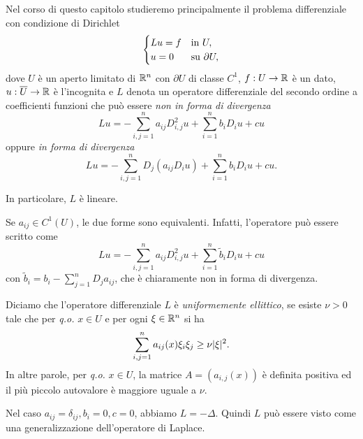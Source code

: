 Nel corso di questo capitolo studieremo principalmente il problema differenziale con condizione di Dirichlet
\begin{equation}
	\begin{cases}
		Lu = f & \textup{in } U,\\
		u = 0 & \textup{su } \partial U,
	\end{cases}
\end{equation}
dove $U$ è un aperto limitato di $\mathbb{R}^n$ con $\partial U$ di classe $C^1$, $f: U \to \mathbb{R}$ è un dato, $u: \overline{U} \to \mathbb{R}$ è l'incognita e $L$ denota un operatore differenziale del secondo ordine a coefficienti funzioni che può essere \emph{non in forma di divergenza}
\[ Lu = -\sum_{i,j=1}^{n}a_{ij}D^2_{i,j}u + \sum_{i=1}^{n}b_i D_iu + cu \]
oppure \emph{in forma di divergenza}
\[ Lu = -\sum_{i,j=1}^{n}D_{j}(a_{ij}D_iu) + \sum_{i=1}^{n}b_i D_iu + cu. \]

In particolare, $L$ è lineare.

\begin{osservazione}
	Se $a_{ij} \in C^1(U)$, le due forme sono equivalenti. Infatti, l'operatore può essere scritto come
	\[ Lu = -\sum_{i,j=1}^{n}a_{ij}D^2_{i,j}u + \sum_{i=1}^{n}\tilde{b}_i D_iu + cu \]
	con $\tilde{b}_i = b_i - \sum_{j=1}^{n}D_j a_{ij}$, che è chiaramente non in forma di divergenza.
\end{osservazione}

\begin{definizione}
	Diciamo che l'operatore differenziale $L$ è \emph{uniformemente ellittico}, se esiste $\nu > 0$ tale che per \emph{q.o.} $ x \in U$ e per ogni $\xi \in \mathbb{R}^n$ si ha
	\[ \sum_{i,j=1}^n a_{ij}(x)\xi_i\xi_j \ge \nu \lvert\xi\rvert^2. \]
	In altre parole, per \emph{q.o.} $x \in U$, la matrice $A = (a_{i,j}(x))$ è definita positiva ed il più piccolo autovalore è maggiore uguale a $\nu$.
\end{definizione}

Nel caso $a_{ij} = \delta_{ij}, b_i = 0, c=0$, abbiamo $L = - \Delta$. Quindi $L$ può essere visto come una generalizzazione dell'operatore di Laplace.

